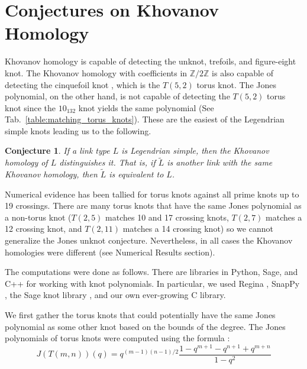 \documentclass{article}
\theoremstyle{plain}
\newtheorem{conjecture}{Conjecture}
\begin{document}
    \section{Conjectures on Khovanov Homology}
        Khovanov homology is capable of detecting the
        unknot, trefoils, and figure-eight knot. The Khovanov homology with
        coefficients in $\mathbb{Z}/2\mathbb{Z}$ is also capable of detecting
        the cinquefoil knot \cite{BaldwinYingSivekCinquefoilKhovanov},
        which is the $T(5,2)$ torus knot. The Jones
        polynomial, on the other hand, is not capable of detecting the
        $T(5,2)$ torus knot since the $10_{132}$ knot yields the same
        polynomial (See Tab.~\ref{table:matching_torus_knots}).
        These are the easiest of the Legendrian simple knots
        leading us to the following.
        \begin{conjecture}
            If a link type $L$ is Legendrian simple, then the Khovanov homology
            of $L$ distinguishes it. That is, if $\tilde{L}$
            is another link with the same Khovanov homology, then $\tilde{L}$ is
            equivalent to $L$.
        \end{conjecture}
        Numerical evidence has been tallied for torus knots
        against all prime knots up to 19 crossings. There are many
        torus knots that have the same Jones polynomial as a non-torus knot
        ($T(2,5)$ matches 10 and 17 crossing knots, $T(2,7)$
        matches a 12 crossing knot, and $T(2,11)$ matches a 14 crossing knot)
        so we cannot generalize the Jones unknot conjecture. Nevertheless, in
        all cases the Khovanov homologies were different
        (see Numerical Results section).
        \par\hfill\par
        The computations were done as follows. There are libraries in Python,
        Sage, and C++ for working with knot polynomials. In particular, we used
        Regina \cite{regina}, SnapPy \cite{SnapPy}, the Sage knot library
        \cite{sage}, and our own ever-growing C library.
        \par\hfill\par
        We first gather the torus knots that could potentially have the same
        Jones polynomial as some other knot based on the bounds of the degree.
        The Jones polynomials of torus knots were computed using the formula
        \cite{jonesfordummyvjones}:
        \begin{equation}
            \label{eqn:jones_poly_torus}%
            J(T(m,n))(q)=q^{(m-1)(n-1)/2}
                \frac{1-q^{m+1}-q^{n+1}+q^{m+n}}{1-q^{2}}
        \end{equation}
\end{document}
